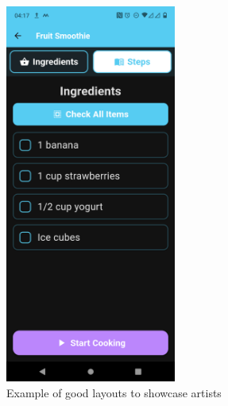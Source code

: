 \documentclass[]{project_final}
\begin{document}
\begin{figure}[ht!]
\begin{minipage}[t]{0.4\textwidth}
    \includegraphics[width=0.5\textwidth]{preingredients.png}
  \end{minipage}
  \caption{Example of good layouts to showcase artists}
  \label{fig:1}
\end{figure}
\end{document}
